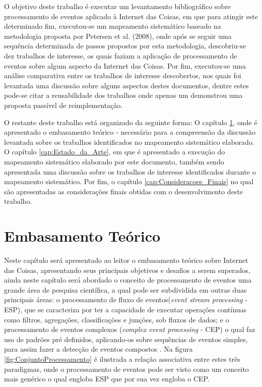 \documentclass[ti,table]{texufpel} %
\begin{document}
  

O objetivo deste trabalho é executar um levantamento bibliográfico sobre processamento de eventos aplicado à Internet das Coisas, em que para atingir este determinado fim, executou-se um mapeamento sistemático baseado na metodologia proposta por Petersen et al. (2008), onde após se seguir uma sequência determinada de passos propostos por esta metodologia, descobriu-se dez trabalhos de interesse, os quais faziam a aplicação de processamento de eventos sobre algum aspecto da Internet das Coisas. Por fim, executou-se uma análise comparativa entre os trabalhos de interesse descobertos, nos quais foi levantada uma discussão sobre alguns aspectos destes documentos, dentre estes pode-se citar a reusabilidade dos trabalhos onde apenas um demonstrou uma proposta passível de reimplementação.  

  

  

O restante deste trabalho está organizado da seguinte forma: O capítulo \ref{cap:Embasamento_Teorico}, onde é apresentado o embasamento teórico - necessário para a compreensão da discussão levantada sobre os trabalhos identificados no mapeamento sistemático elaborado. O capítulo \ref{cap:Estado_da_Arte}, em que é apresentado a execução do mapeamento sistemático elaborado por este documento, também sendo apresentada uma discussão sobre os trabalhos de interesse identificados durante o mapeamento sistemático. Por fim, o capítulo \ref{cap:Consideracoes_Finais} no qual são apresentadas as considerações finais obtidas com o desenvolvimento deste trabalho. 

  

  

  

  

\chapter{Embasamento Teórico} 

\label{cap:Embasamento_Teorico} 

  

Neste capítulo será apresentado ao leitor o embasamento teórico sobre Internet das Coisas, apresentando seus principais objetivos e desafios a serem superados, ainda neste capítulo será abordado o conceito de processamento de eventos uma grande área de pesquisa científica, a qual pode ser subdividida em outras duas principais áreas: o processamento de fluxo de eventos(\textit{event stream processing} - ESP), que se caracteriza por ter a capacidade de executar operações contínuas como filtros, agregações, classificações e junções, sob fluxos de dados; e o processamento de eventos complexos (\textit{complex event processing} - CEP) o qual faz uso de padrões pré definidos, aplicando-os sobre sequências de eventos simples, para assim fazer a detecção de eventos compostos \cite{dayarathna2018recent}. Na figura \ref{fig:ConjuntoProcessamento} é ilustrada a relação associativa entre estes três paradigmas, onde o processamento de eventos pode ser visto como um conceito mais genérico o qual engloba ESP que por sua vez engloba o CEP. 
\end{document}
